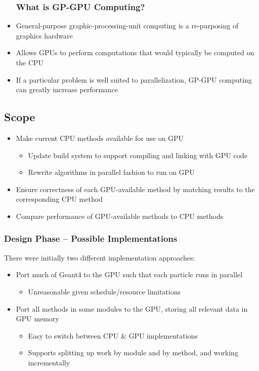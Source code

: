\documentclass{beamer}
\begin{document}
\begin{frame}
\begin{itemize}
\frametitle{What is GP-GPU Computing?}
\item General-purpose graphic-processing-unit computing is a re-purposing of graphics hardware
\item Allows GPUs  to perform computations that would typically be computed on the CPU
\item If a particular problem is well suited to parallelization, GP-GPU computing can greatly increase performance
\end{itemize}
\end{frame}

\subsection{Scope}
\begin{frame}
\begin{itemize}
\frametitle{Scope}
\item Make current CPU methods available for use on GPU
\begin{itemize}
\item Update build system to support compiling and linking with GPU code
\item Rewrite algorithms in parallel fashion to run on GPU
\end{itemize}
\item Ensure correctness of each GPU-available method by matching results to the corresponding CPU method
\item Compare performance of GPU-available methods to CPU methods
\end{itemize}
\end{frame}

\begin{frame}
\frametitle{Design Phase -- Possible Implementations}
There were initially two different implementation approaches:
\begin{itemize}
\item Port much of Geant4 to the GPU such that each particle runs in parallel
\begin{itemize}
\item Unreasonable given schedule/resource limitations
\end{itemize}
\item Port all methods in some modules to the GPU, storing all relevant data in GPU memory
\begin{itemize}
\item Easy to switch between CPU \& GPU implementations
\item Supports splitting up work by module and by method, and working incrementally
\end{itemize}
\end{itemize}
\end{frame}
\end{document}
